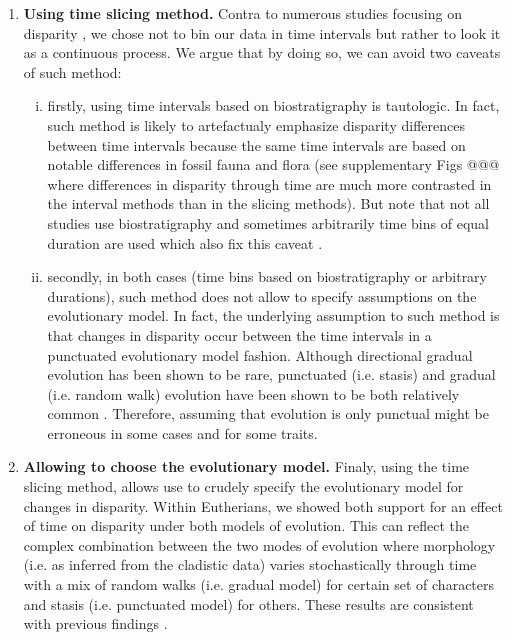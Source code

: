 \documentclass[12pt,letterpaper]{article}
\begin{document}
\begin{enumerate}
    \item \textbf{Using time slicing method.}
    Contra to numerous studies focusing on disparity \citep[e.g][]{cisneros2010,prentice2011,Hughes20082013,hopkinsdecoupling2013,bentonmodels2014,bensonfaunal2014}, we chose not to bin our data in time intervals but rather to look it as a continuous process.
    We argue that by doing so, we can avoid two caveats of such method: 
    \begin{enumerate}[(i)]
        \item firstly, using time intervals based on biostratigraphy is tautologic.
        In fact, such method is likely to artefactualy emphasize disparity differences between time intervals because the same time intervals are based on notable differences in fossil fauna and flora (see supplementary Figs @@@ where differences in disparity through time are much more contrasted in the interval methods than in the slicing methods).
        But note that not all studies use biostratigraphy and sometimes arbitrarily time bins of equal duration are used which also fix this caveat \citep{Butler2012,hopkinsdecoupling2013,bensonfaunal2014}.
        \item secondly, in both cases (time bins based on biostratigraphy or arbitrary durations), such method does not allow to specify assumptions on the evolutionary model.
        In fact, the underlying assumption to such method is that changes in disparity occur between the time intervals in a punctuated evolutionary model fashion.
        Although directional gradual evolution has been shown to be rare, punctuated (i.e. stasis) and gradual (i.e. random walk) evolution have been shown to be both relatively common \citep{Hunt20112007,Hunt21042015}.
        Therefore, assuming that evolution is only punctual might be erroneous in some cases and for some traits.
    \end{enumerate}
    \item \textbf{Allowing to choose the evolutionary model.}
    Finaly, using the time slicing method, allows use to crudely specify the evolutionary model for changes in disparity.
    Within Eutherians, we showed both support for an effect of time on disparity under both models of evolution.
    This can reflect the complex combination between the two modes of evolution where morphology (i.e. as inferred from the cladistic data) varies stochastically through time with a mix of random walks (i.e. gradual model) for certain set of characters and stasis (i.e. punctuated model) for others.
    These results are consistent with previous findings \citep{Hunt20112007,Hunt21042015}.

\end{enumerate}
\end{document}

